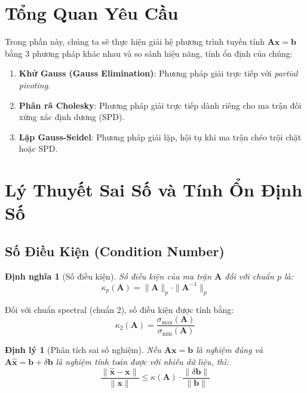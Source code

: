 \documentclass[a4paper,12pt]{report}
\newtheorem{definition}{Định nghĩa}
\newtheorem{theorem}{Định lý}
\begin{document}
\section{Tổng Quan Yêu Cầu}
Trong phần này, chúng ta sẽ thực hiện giải hệ phương trình tuyến tính $\mathbf{Ax} = \mathbf{b}$ bằng 3 phương pháp khác nhau và so sánh hiệu năng, tính ổn định của chúng:
\begin{enumerate}
    \item \textbf{Khử Gauss (Gauss Elimination)}: Phương pháp giải trực tiếp với \textit{partial pivoting}.
    \item \textbf{Phân rã Cholesky}: Phương pháp giải trực tiếp dành riêng cho ma trận đối xứng xác định dương (SPD).
    \item \textbf{Lặp Gauss-Seidel}: Phương pháp giải lặp, hội tụ khi ma trận chéo trội chặt hoặc SPD.
\end{enumerate}

\section{Lý Thuyết Sai Số và Tính Ổn Định Số}

\subsection{Số Điều Kiện (Condition Number)}

\begin{definition}[Số điều kiện]
Số điều kiện của ma trận $\mathbf{A}$ đối với chuẩn $p$ là:
\begin{equation}
    \kappa_p(\mathbf{A}) = \|\mathbf{A}\|_p \cdot \|\mathbf{A}^{-1}\|_p \label{eq:cond}
\end{equation}
\end{definition}

Đối với chuẩn spectral (chuẩn 2), số điều kiện được tính bằng:
$$ \kappa_2(\mathbf{A}) = \frac{\sigma_{\max}(\mathbf{A})}{\sigma_{\min}(\mathbf{A})} $$

\begin{theorem}[Phân tích sai số nghiệm]
Nếu $\mathbf{Ax} = \mathbf{b}$ là nghiệm đúng và $\mathbf{A\hat{x}} = \mathbf{b} + \delta\mathbf{b}$ là nghiệm tính toán được với nhiễu dữ liệu, thì:
\begin{equation}
    \frac{\|\mathbf{\hat{x}} - \mathbf{x}\|}{\|\mathbf{x}\|} \le \kappa(\mathbf{A}) \cdot \frac{\|\delta\mathbf{b}\|}{\|\mathbf{b}\|} \label{eq:error}
\end{equation}
\end{theorem}
\end{document}
